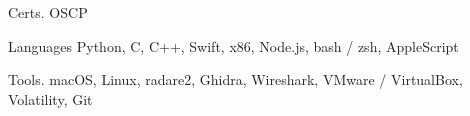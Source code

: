 
\begin{cvskills}
	\cvskill
	{Certs\hphantom{25}\color{white}.\hphantom{25}} %
	{OSCP} %

	\cvskill
	{Languages} %
	{Python, C, C++, Swift, x86, Node.js, bash / zsh, AppleScript} %

	\cvskill
	{Tools\hphantom{25}\color{white}.\hphantom{25}} %
	{macOS, Linux, radare2, Ghidra, Wireshark, VMware / VirtualBox, Volatility, Git} %

\end{cvskills}
